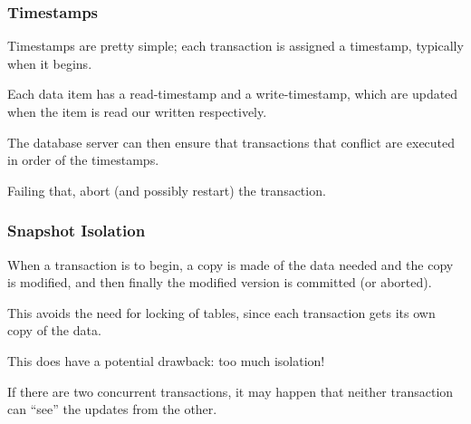 \begin{frame}
\frametitle{Timestamps}

Timestamps are pretty simple; each transaction is assigned a timestamp, typically when it begins. 

Each data item has a read-timestamp and a write-timestamp, which are updated when the item is read our written respectively. 

The database server can then ensure that transactions that conflict are executed in order of the timestamps. 

Failing that, abort (and possibly restart) the transaction.


\end{frame}

\begin{frame}
\frametitle{Snapshot Isolation}
When a transaction is to begin, a copy is made of the data needed and the copy is modified, and then finally the modified version is committed (or aborted). 

This avoids the need for locking of tables, since each transaction gets its own copy of the data.

This does have a potential drawback: too much isolation! 

If there are two concurrent transactions, it may happen that neither transaction can ``see'' the updates from the other.

\end{frame}




